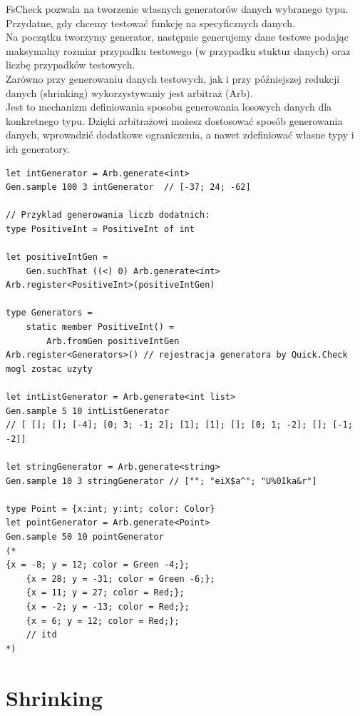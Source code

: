 FsCheck pozwala na tworzenie własnych generatorów danych wybranego typu. Przydatne, gdy chcemy testować funkcję na specyficznych danych. \\
Na początku tworzymy generator, następnie generujemy dane testowe podając maksymalny rozmiar przypadku testowego (w przypadku stuktur danych) oraz liczbę przypadków testowych.\\
Zarówno przy generowaniu danych testowych, jak i przy późniejszej redukcji danych (shrinking) wykorzystywaniy jest arbitraż (Arb).\\
Jest to mechanizm definiowania sposobu generowania losowych danych dla konkretnego typu. Dzięki arbitrażowi możesz dostosować sposób generowania danych, wprowadzić dodatkowe ograniczenia, a nawet zdefiniować własne typy i ich generatory.

\lstset{language=FSharp, basicstyle=\scriptsize\ttfamily}
\begin{lstlisting}[frame=single,caption={Przykład generatora dla liczb dodatnich},label=kod:listingA]
let intGenerator = Arb.generate<int>
Gen.sample 100 3 intGenerator  // [-37; 24; -62]

// Przyklad generowania liczb dodatnich:
type PositiveInt = PositiveInt of int

let positiveIntGen =
    Gen.suchThat ((<) 0) Arb.generate<int>
Arb.register<PositiveInt>(positiveIntGen)

type Generators =
    static member PositiveInt() =
        Arb.fromGen positiveIntGen
Arb.register<Generators>() // rejestracja generatora by Quick.Check mogl zostac uzyty

let intListGenerator = Arb.generate<int list>
Gen.sample 5 10 intListGenerator 
// [ []; []; [-4]; [0; 3; -1; 2]; [1]; [1]; []; [0; 1; -2]; []; [-1; -2]]

let stringGenerator = Arb.generate<string>
Gen.sample 10 3 stringGenerator // [""; "eiX$a^"; "U%0Ika&r"]

type Point = {x:int; y:int; color: Color}
let pointGenerator = Arb.generate<Point>
Gen.sample 50 10 pointGenerator
(*
{x = -8; y = 12; color = Green -4;};
    {x = 28; y = -31; color = Green -6;};
    {x = 11; y = 27; color = Red;};
    {x = -2; y = -13; color = Red;};
    {x = 6; y = 12; color = Red;};
    // itd
*)
\end{lstlisting}

\section*{Shrinking}

